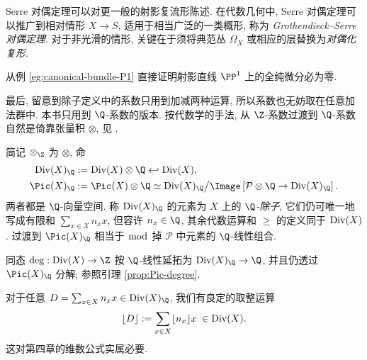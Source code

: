 Serre 对偶定理可以对更一般的射影复流形陈述. 在代数几何中, Serre 对偶定理可以推广到相对情形 $X \to S$, 适用于相当广泛的一类概形, 称为 \emph{Grothendieck--Serre 对偶定理}. 对于非光滑的情形, 关键在于须将典范丛 $\Omega_X$ 或相应的层替换为\emph{对偶化复形}.

\begin{exercise}
	从例 \ref{eg:canonical-bundle-P1} 直接证明射影直线 $\PP^1$ 上的全纯微分必为零.
\end{exercise}

最后, 留意到除子定义中的系数只用到加减两种运算, 所以系数也无妨取在任意加法群中. 本书只用到 $\Q$-系数的版本. 按代数学的手法, 从 $\Z$-系数过渡到 $\Q$-系数自然是倚靠张量积 $\otimes$, 见 \cite[\S 6.6]{Li1}.

\begin{definition}   
	简记 $\otimes_{\Z}$ 为 $\otimes$, 命
	\begin{align*}
		\Div(X)_{\Q} & := \Div(X) \otimes \Q \hookleftarrow \Div(X), \\
		\Pic(X)_{\Q} & := \Pic(X) \otimes \Q \simeq \Div(X)_{\Q} \big/ \Image\left[ \mathcal{P} \otimes \Q \to \Div(X)_{\Q} \right].
	\end{align*}
	两者都是 $\Q$-向量空间. 称 $\Div(X)_{\Q}$ 的元素为 $X$ 上的 \emph{$\Q$-除子}, 它们仍可唯一地写成有限和 $\sum_{x \in X} n_x x$, 但容许 $n_x \in \Q$, 其余代数运算和 $\geq$ 的定义同于 $\operatorname{Div}(X)$. 过渡到 $\Pic(X)_{\Q}$ 相当于 $\bmod$ 掉 $\mathcal{P}$ 中元素的 $\Q$-线性组合.
\end{definition}

同态 $\deg: \Div(X) \to \Z$ 按 $\Q$-线性延拓为 $\Div(X)_{\Q} \to \Q$, 并且仍透过 $\Pic(X)_{\Q}$ 分解; 参照引理 \ref{prop:Pic-degree}.

对于任意 $D = \sum_{x \in X} n_x x \in \Div(X)_{\Q}$, 我们有良定的取整运算 
\[ \lfloor D \rfloor := \sum_{x \in X} \lfloor n_x \rfloor x \; \in \operatorname{Div}(X). \]
这对第四章的维数公式实属必要.
